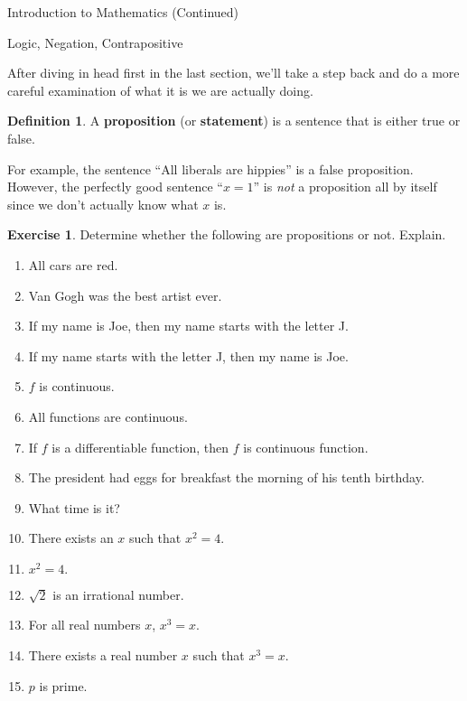 \documentclass[11pt]{article}
\theoremstyle{definition}
\newtheorem{definition}[theorem]{Definition}
\newtheorem{exercise}[theorem]{Exercise}
\begin{document}
\addtocounter{section}{0}

\begin{section}{Introduction to Mathematics (Continued)}

\addtocounter{subsection}{1}
\addtocounter{theorem}{20}

\begin{subsection}{Logic, Negation, Contrapositive}

After diving in head first in the last section, we'll take a step back and do a more careful examination of what it is we are actually doing.

\begin{definition}
A \textbf{proposition} (or \textbf{statement}) is a sentence that is either true or false.
\end{definition}

For example, the sentence ``All liberals are hippies'' is a false proposition.  However, the perfectly good sentence ``$x=1$'' is \emph{not} a proposition all by itself since we don't actually know what $x$ is.

\begin{exercise} Determine whether the following are propositions or not. Explain.
\begin{enumerate}
\item All cars are red.
\item Van Gogh was the best artist ever. 
\item If my name is Joe, then my name starts with the letter J.
\item If my name starts with the letter J, then my name is Joe.
\item $f$ is continuous.
\item All functions are continuous.
\item If $f$ is a differentiable function, then $f$ is continuous function.
\item The president had eggs for breakfast the morning of his tenth birthday.
\item What time is it? 
\item There exists an $x$ such that $x^2=4$.
\item $x^2=4.$
\item $\sqrt{2}$ is an irrational number.
\item For all real numbers $x$, $x^3=x$.
\item There exists a real number $x$ such that $x^3=x$.
\item $p$ is prime.
\end{enumerate}
\end{exercise}


\end{subsection}
\end{section}
\end{document}
